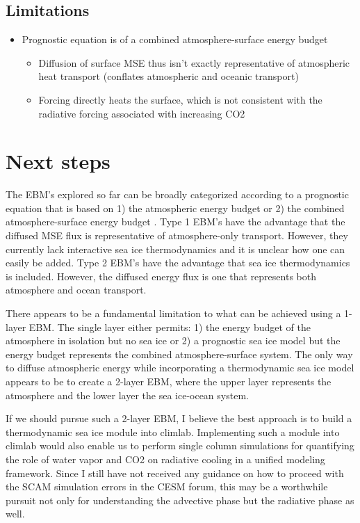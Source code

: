 \documentclass{article}
\begin{document}
\subsection{Limitations}
\begin{itemize}
    \item Prognostic equation is of a combined atmosphere-surface energy budget 
        \begin{itemize}
            \item Diffusion of surface MSE thus isn't exactly representative of atmospheric heat transport (conflates atmospheric and oceanic transport)
            \item Forcing directly heats the surface, which is not consistent with the radiative forcing associated with increasing CO2
        \end{itemize}
\end{itemize}

\section{Next steps}
The EBM's explored so far can be broadly categorized according to a prognostic equation that is based on 1) the atmospheric energy budget \citep{hwang2010, mooring2020} or 2) the combined atmosphere-surface energy budget \citep{wagner2015, feldl2021}. Type 1 EBM's have the advantage that the diffused MSE flux is representative of atmosphere-only transport. However, they currently lack interactive sea ice thermodynamics and it is unclear how one can easily be added. Type 2 EBM's have the advantage that sea ice thermodynamics is included. However, the diffused energy flux is one that represents both atmosphere and ocean transport.

There appears to be a fundamental limitation to what can be achieved using a 1-layer EBM. The single layer either permits: 1) the energy budget of the atmosphere in isolation but no sea ice or 2) a prognostic sea ice model but the energy budget represents the combined atmosphere-surface system. The only way to diffuse atmospheric energy while incorporating a thermodynamic sea ice model appears to be to create a 2-layer EBM, where the upper layer represents the atmosphere and the lower layer the sea ice-ocean system.

If we should pursue such a 2-layer EBM, I believe the best approach is to build a thermodynamic sea ice module into climlab. Implementing such a module into climlab would also enable us to perform single column simulations for quantifying the role of water vapor and CO2 on radiative cooling in a unified modeling framework. Since I still have not received any guidance on how to proceed with the SCAM simulation errors in the CESM forum, this may be a worthwhile pursuit not only for understanding the advective phase but the radiative phase as well. 
\end{document}
